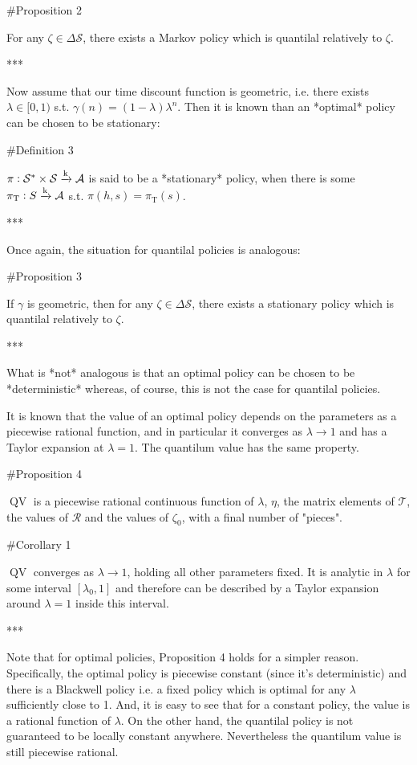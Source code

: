 \documentclass[a4paper]{article}
\newcommand{\AP}[1]{\left(#1\right)}
\newcommand{\AB}[1]{\left[#1\right]}
\newcommand{\K}{\xrightarrow{\textnormal{k}}}
\newcommand{\A}{\mathcal{A}}
\newcommand{\St}{\mathcal{S}}
\newcommand{\T}{\mathcal{T}}
\newcommand{\R}{\mathcal{R}}
\newcommand{\QV}{\operatorname{QV}}
\begin{document}
\#Proposition 2

For any $\zeta\in\Delta\St$, there exists a Markov policy which is quantilal relatively to $\zeta$.

***

Now assume that our time discount function is geometric, i.e. there exists $\lambda\in[0,1)$ s.t. $\gamma(n)=(1-\lambda)\lambda^n$. Then it is known than an *optimal* policy can be chosen to be stationary:

\#Definition 3

$\pi: \St^* \times \St \K \A$ is said to be a *stationary* policy, when there is some $\pi_\text{T}: S \K \A$ s.t. $\pi(h,s)=\pi_\text{T}\AP{s}$.

***

Once again, the situation for quantilal policies is analogous:

\#Proposition 3

If $\gamma$ is geometric, then for any $\zeta\in\Delta\St$, there exists a stationary policy which is quantilal relatively to $\zeta$.

***

What is *not* analogous is that an optimal policy can be chosen to be *deterministic* whereas, of course, this is not the case for quantilal policies.

It is known that the value of an optimal policy depends on the parameters as a piecewise rational function, and in particular it converges as $\lambda \rightarrow 1$ and has a Taylor expansion at $\lambda=1$. The quantilum value has the same property.

\#Proposition 4

$\QV$ is a piecewise rational continuous function of $\lambda$, $\eta$, the matrix elements of $\T$, the values of $\R$ and the values of $\zeta_0$, with a final number of "pieces".

\#Corollary 1

$\QV$ converges as $\lambda \rightarrow 1$, holding all other parameters fixed. It is analytic in $\lambda$ for some interval $\AB{\lambda_0,1}$ and therefore can be described by a Taylor expansion around $\lambda=1$ inside this interval.

***

Note that for optimal policies, Proposition 4 holds for a simpler reason. Specifically, the optimal policy is piecewise constant (since it's deterministic) and there is a Blackwell policy i.e. a fixed policy which is optimal for any $\lambda$ sufficiently close to 1. And, it is easy to see that for a constant policy, the value is a rational function of $\lambda$. On the other hand, the quantilal policy is not guaranteed to be locally constant anywhere. Nevertheless the quantilum value is still piecewise rational.
\end{document}
